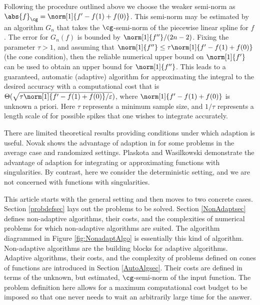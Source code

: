 \documentclass[]{elsarticle}
\theoremstyle{definition}
\theoremstyle{remark}
\newcommand{\Gnorm}[1]{\abs{#1}_{\cg}}
\begin{document}
Following the procedure outlined above we choose the weaker semi-norm as $\Gnorm{f} = \norm[1]{f'-f(1)+f(0)}$.  This semi-norm may be estimated by an algorithm $G_n$ that takes the $\cg$-semi-norm of the piecewise linear spline for $f$.  The error for $G_n(f)$ is bounded by $\norm[1]{f''}/(2n-2)$.  Fixing the parameter $\tau > 1$, and assuming that $\norm[1]{f''} \le \tau \norm[1]{f'-f(1)+f(0)}$  (the cone condition), then the reliable numerical upper bound on $\norm[1]{f'}$ can be used to obtain an upper bound for $\norm[1]{f''}$.   
This leads to a guaranteed, automatic (adaptive) algorithm for approximating the integral to the desired accuracy with a computational cost that is $\Theta(\sqrt{\tau \norm[1]{f'-f(1)+f(0)}/\varepsilon})$, where $\norm[1]{f'-f(1)+f(0)}$ is unknown a priori.  Here $\tau$ represents a minimum sample size, and $1/\tau$ represents a length scale of for possible spikes that one wishes to integrate accurately.

There are limited theoretical results providing conditions under which adaption is useful.  Novak \cite{Nov96a} shows the advantage of adaption in for some problems in the average case and randomized settings.  Plaskota and Wasilkowski \cite{PlaWas05a,PlaEtal08a} demonstrate the advantage of adaption for integrating or approximating functions with singularities. By contrast, here we consider the deterministic setting, and we are not concerned with functions with singularities.

This article starts with the general setting and then moves to two concrete cases.  Section \ref{probdefsec} lays out the problems to be solved.  Section \ref{NonAdaptsec} defines non-adaptive algorithms, their costs, and the complexities of numerical problems for which non-adaptive algorithms are suited.  The algorithm diagrammed in Figure \ref{fig:NonadaptAlgo} is essentially this kind of algorithm.  Non-adaptive algorithms are the building blocks for adaptive algorithms.  Adaptive algorithms, their costs, and the complexity of problems defined on cones of functions are introduced in Section \ref{AutoAlgsec}.  Their costs are defined in terms of the unknown, but estimated, $\cg$-semi-norm of the input function.  The problem definition here allows for a maximum computational cost budget to be imposed so that one never needs to wait an arbitrarily large time for the answer.  
\end{document}
